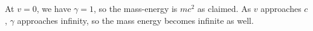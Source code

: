 At $v=0$, we have $\gamma=1$, so the mass-energy is $mc^2$ as claimed. As $v$ approaches
$c$, $\gamma$ approaches infinity, so the mass energy becomes infinite as well.



